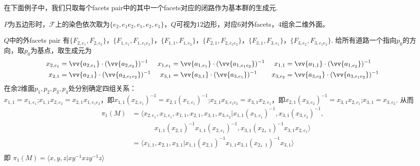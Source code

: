 \documentclass{article}
\theoremstyle{plain}%
\theoremstyle{definition}
\theoremstyle{remark}
\begin{document}
{在下面例子中，我们只取每个facets pair中的其中一个facets对应的闭路作为基本群的生成元.

{\exmp $P$为五边形时，$\mathcal{F}$上的染色依次取为$\{e_2,e_1e_2,e_1,e_2,e_1\}$，$Q$可视为$12$边形，对应$6$对外facets，$4$组余二维外面。
\begin{figure}[h]
\centering
\def\svgwidth{0.85\textwidth}

\end{figure}

$Q$中的外facets pair 有$\{F_{2,e_1},F_{2,e_2}\}$，$\{F_{1,e_1},F_{1,e_1e_2}\}$，$\{F_{1,1},F_{1,e_2}\}$，$\{F_{2,1},F_{2,e_1e_2}\}$，$\{F_{3,1},F_{3,e_1}\}$，$\{F_{3,e_2},F_{3,e_1e_2}\}$. 
给所有道路一个指向$p_0$的方向，取$p_0$为基点，取生成元为
\begin{align*}
x_{2,e_1}&= \vv{a_{2,e_1}}\cdot(\vv{a_{2,e_2}})^{-1}&
x_{1,e_1}&= \vv{a_{1,e_1}}\cdot(\vv{a_{1,e_1e_2}})^{-1}&
x_{1,1}  &= \vv{a_{1,1}}\cdot(\vv{a_{1,e_2}})^{-1}\\
x_{2,1}  &= \vv{a_{2,1}}\cdot(\vv{a_{2,e_1e_2}})^{-1}&
x_{3,1}  &=\vv{a_{3,1}}\cdot(\vv{a_{3,e_1}})^{-1}&
x_{3,e_2}&= \vv{a_{3,e_2}}\cdot(\vv{a_{3,e_1e_2}})^{-1}
\end{align*}
在余$2$维面$p_1,p_2,p_3,p_4$处分别确定四组关系：\\
$x_{1,1}=x_{1,e_1}$;$x_{1,1}x_{2,e_2}=x_{2,1}x_{1,e_1e_2}$，即$x_{1,1}(x_{2,e_1})^{-1}=x_{2,1}(x_{1,e_1})^{-1}$;$x_{2,1}x_{3,e_1e_2}=x_{3,1}x_{2,e_1}$，即$x_{2,1}(x_{3,e_2})^{-1}=x_{3,1}x_{2,e_1}$;$x_{3,1}=x_{3,e_2}$.
从而
\begin{equation}\label{eq4}
\begin{split}
\pi_1(M)&=\langle x_{2,e_1},x_{1,e_1},x_{1,1},x_{2,1},x_{3,1},x_{3,e_2}|
x_{1,1}(x_{1,e_1})^{-1},x_{3,1}(x_{3,e_2})^{-1},\\&~~~~~~~~~~~~~~~x_{1,1}(x_{2,1})^{-1}x_{1,1}(x_{2,e_1})^{-1}, x_{3,1}(x_{2，1})^{-1}x_{3,1}x_{2,e_1}
\rangle \\
&=\langle x_{1,1},x_{2,1},x_{3,1}|x_{1,1}(x_{2,1})^{-1}x_{1,1}x_{3,1}(x_{2，1})^{-1}x_{3,1}
\rangle \\
\end{split}\end{equation}
即
$\pi_1(M)=\langle x,y,z|xy^{-1}xzy^{-1}z\rangle$\\}
}
\end{document}
